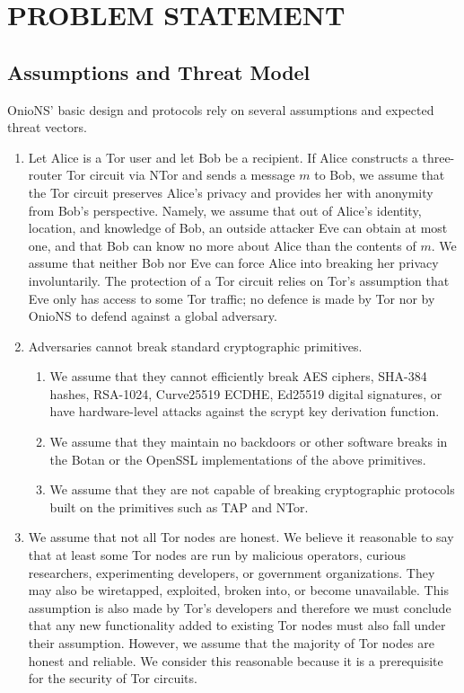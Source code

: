 
\chapter{PROBLEM STATEMENT}

\section{Assumptions and Threat Model}
\label{sec:Assumptions}

OnioNS' basic design and protocols rely on several assumptions and expected threat vectors.

\begin{enumerate}
	\item Let Alice is a Tor user and let Bob be a recipient. If Alice constructs a three-router Tor circuit via NTor and sends a message $ m $ to Bob, we assume that the Tor circuit preserves Alice's privacy and provides her with anonymity from Bob's perspective. Namely, we assume that out of Alice's identity, location, and knowledge of Bob, an outside attacker Eve can obtain at most one, and that Bob can know no more about Alice than the contents of $ m $. We assume that neither Bob nor Eve can force Alice into breaking her privacy involuntarily. The protection of a Tor circuit relies on Tor's assumption that Eve only has access to some Tor traffic; no defence is made by Tor nor by OnioNS to defend against a global adversary.
	\item Adversaries cannot break standard cryptographic primitives.
		\begin{enumerate}
			\item We assume that they cannot efficiently break AES ciphers, SHA-384 hashes, RSA-1024, Curve25519 ECDHE, Ed25519 digital signatures, or have hardware-level attacks against the scrypt key derivation function.
			\item We assume that they maintain no backdoors or other software breaks in the Botan or the OpenSSL implementations of the above primitives.
			\item We assume that they are not capable of breaking cryptographic protocols built on the primitives such as TAP and NTor.
		\end{enumerate}
	\item We assume that not all Tor nodes are honest. We believe it reasonable to say that at least some Tor nodes are run by malicious operators, curious researchers, experimenting developers, or government organizations. They may also be wiretapped, exploited, broken into, or become unavailable. This assumption is also made by Tor's developers and therefore we must conclude that any new functionality added to existing Tor nodes must also fall under their assumption. However, we assume that the majority of Tor nodes are honest and reliable. We consider this reasonable because it is a prerequisite for the security of Tor circuits.

\end{enumerate}
